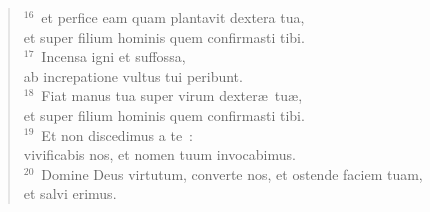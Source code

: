 \begin{verse}
${}^{16}$~et perfice eam quam plantavit dextera tua,\\ et super filium hominis quem confirmasti tibi.\\
${}^{17}$~Incensa igni et suffossa,\\ ab increpatione vultus tui peribunt.\\
${}^{18}$~Fiat manus tua super virum dexter\ae\ tu\ae ,\\ et super filium hominis quem confirmasti tibi.\\
${}^{19}$~Et non discedimus a te~:\\ vivificabis nos, et nomen tuum invocabimus.\\
${}^{20}$~Domine Deus virtutum, converte nos, et ostende faciem tuam,\\ et salvi erimus.\end{verse}



